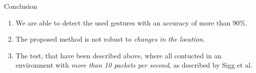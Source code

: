 \documentclass[final,hyperref={pdfpagelabels=false}]{beamer}
\begin{document}
\begin{frame}[t]
\begin{columns}[t]
\begin{column}{.465\textwidth}
\begin{block}{Conclusion}
\begin{enumerate}
 \item \large We are able to detect the used gestures with an accuracy of more than \emph{$90 \%$}.
 \item The proposed method is not robust to \emph{changes in the location}.
 \item The test, that have been described above, where all contucted in an environment with \emph{more than 10 packets per second}, as described by Sigg et al.
\end{enumerate}


\end{block}




%         
% 





\end{column}
\end{columns}
\end{frame}
\end{document}
